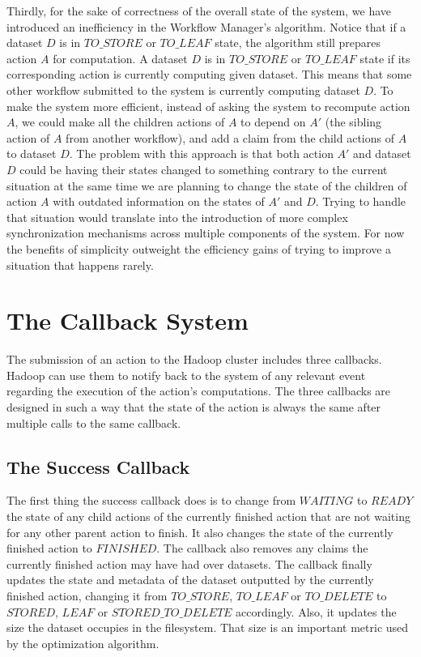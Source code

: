 Thirdly, for the sake of correctness of the overall state of the system, we have introduced an inefficiency in the Workflow Manager's algorithm. Notice that if a dataset $D$ is in $TO\_STORE$ or $TO\_LEAF$ state, the algorithm still prepares action $A$ for computation. A dataset $D$ is in $TO\_STORE$ or $TO\_LEAF$ state if its corresponding action is currently computing given dataset. This means that some other workflow submitted to the system is currently computing dataset $D$. To make the system more efficient, instead of asking the system to recompute action $A$, we could make all the children actions of $A$ to depend on $A'$ (the sibling action of $A$ from another workflow), and add a claim from the child actions of $A$ to dataset $D$. The problem with this approach is that both action $A'$ and dataset $D$ could be having their states changed to something contrary to the current situation at the same time we are planning to change the state of the children of action $A$ with outdated information on the states of $A'$ and $D$. Trying to handle that situation would translate into the introduction of more complex synchronization mechanisms across multiple components of the system. For now the benefits of simplicity outweight the efficiency gains of trying to improve a situation that happens rarely.

\section{The Callback System}
\label{sec:callback_system}
The submission of an action to the Hadoop cluster includes three callbacks. Hadoop can use them to notify back to the system of any relevant event regarding the execution of the action's computations. The three callbacks are designed in such a way that the state of the action is always the same after multiple calls to the same callback.

\subsection{The Success Callback}
The first thing the success callback does is to change from $WAITING$ to $READY$ the state of any child actions of the currently finished action that are not waiting for any other parent action to finish. It also changes the state of the currently finished action to $FINISHED$. The callback also removes any claims the currently finished action may have had over datasets. The callback finally updates the state and metadata of the dataset outputted by the currently finished action, changing it from $TO\_STORE$, $TO\_LEAF$ or $TO\_DELETE$ to $STORED$, $LEAF$ or $STORED\_TO\_DELETE$ accordingly. Also, it updates the size the dataset occupies in the filesystem. That size is an important metric used by the optimization algorithm.

